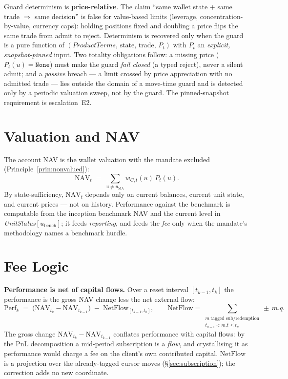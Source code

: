 \documentclass[11pt,a4paper]{article}
\begin{document}
\noindent Guard determinism is \textbf{price-relative}. The claim ``same wallet state $+$ same
trade $\Rightarrow$ same decision'' is false for value-based limits (leverage,
concentration-by-value, currency caps): holding positions fixed and doubling a price flips the
same trade from admit to reject. Determinism is recovered only when the guard is a pure function
of $(\textit{ProductTerms},\,\text{state},\,\text{trade},\,P_t)$ with $P_t$ an \emph{explicit,
snapshot-pinned} input. Two totality obligations follow: a missing price
($P_t(u)=\texttt{None}$) must make the guard \emph{fail closed} (a typed reject), never a silent
admit; and a \emph{passive} breach --- a limit crossed by price appreciation with no admitted
trade --- lies outside the domain of a move-time guard and is detected only by a periodic
valuation sweep, not by the guard. The pinned-snapshot requirement is escalation~E2.

\section{Valuation and NAV}
\label{sec:nav}

The account NAV is the wallet valuation with the mandate excluded
(Principle~\ref{prin:nonvalued}):
\[
\mathrm{NAV}_t \;=\; \sum_{u\neq u_{\mathrm{MA}}} w_{C,t}(u)\,P_t(u).
\]
By state-sufficiency, $\mathrm{NAV}_t$ depends only on current balances, current unit state, and
current prices --- not on history. Performance against the benchmark is computable from the
inception benchmark NAV and the current level in \textit{UnitStatus}$[u_{\mathrm{bench}}]$; it
feeds \emph{reporting}, and feeds the \emph{fee} only when the mandate's methodology names a
benchmark hurdle.

\section{Fee Logic}
\label{sec:fees}

\noindent\textbf{Performance is net of capital flows.} Over a reset interval
$[t_{k-1},t_k]$ the performance is the gross NAV change less the net external flow:
\[
\mathrm{Perf}_k \;=\; \big(\mathrm{NAV}_{t_k}-\mathrm{NAV}_{t_{k-1}}\big)\;-\;
\mathrm{NetFlow}_{[t_{k-1},t_k]},\qquad
\mathrm{NetFlow}=\!\!\sum_{\substack{m\ \text{tagged sub/redemption}\\ t_{k-1}<m.t\le t_k}}\!\!\pm\,m.q.
\]
The gross change $\mathrm{NAV}_{t_k}-\mathrm{NAV}_{t_{k-1}}$ conflates performance with capital
flows: by the PnL decomposition a mid-period subscription is a \emph{flow}, and crystallising it
as performance would charge a fee on the client's own contributed capital. $\mathrm{NetFlow}$ is a
projection over the already-tagged cursor moves (\S\ref{sec:subscription}); the correction adds no
new coordinate.
\end{document}

